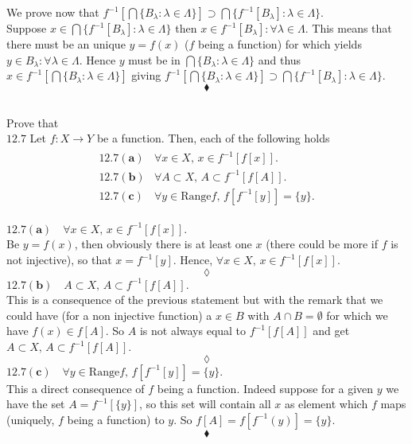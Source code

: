 We prove now that  $f^{-1}\left[\bigcap\{B_{\lambda}:\lambda \in \Lambda\}\right]\supset \bigcap\{f^{-1}[B_{\lambda}]:\lambda \in \Lambda\}$.\\
Suppose $x\in \bigcap\{f^{-1}[B_{\lambda}]:\lambda \in \Lambda\}$ then $x\in f^{-1}[B_{\lambda}]:\forall \lambda \in \Lambda$. This means that there must be an unique $y=f(x)$ ($f$ being a function) for which yields $y\in B_{\lambda}:\forall \lambda \in \Lambda$. Hence $y$ must be in $\bigcap\{B_{\lambda}:\lambda \in \Lambda\}$ and thus $x\in f^{-1}\left[\bigcap\{B_{\lambda}:\lambda \in \Lambda\}\right]$ giving $f^{-1}\left[\bigcap\{B_{\lambda}:\lambda \in \Lambda\}\right]\supset \bigcap\{f^{-1}[B_{\lambda}]:\lambda \in \Lambda\}$.
$$\blacklozenge$$

\subsection{}
\begin{tcolorbox}
Prove that \\
$\mathbf{12.7}$ Let $f:X\rightarrow Y$ be a function. Then, each of the following holds\\  
\begin{align*}
\begin{array}{ll}
\mathbf{12.7(a)}&\forall x\in X,\, x\in f^{-1}[f[x]]. \\
\mathbf{12.7(b)}&\forall A\subset X,\, A\subset f^{-1}[f[A]]. \\
\mathbf{12.7(c)}&\forall y\in \text{Range} f,\,  f[f^{-1}[y]]=\{y\}.
\end{array}
\end{align*}
\end{tcolorbox}
$\mathbf{12.7(a)}\quad \forall x\in X,\, x\in f^{-1}[f[x]]$. \\
Be $y=f(x)$, then obviously there is at least one $x$  (there could be more if $f$ is not injective), so that $x=  f^{-1}[y]$. Hence, $\forall x\in X,\, x\in f^{-1}[f[x]]$.
$$\lozenge$$
$\mathbf{12.7(b)}\quad A\subset X,\, A\subset f^{-1}[f[A]]$.\\
This is a consequence of the previous statement but with the remark that we could have (for a non injective function) a  $x\in B$ with $A\cap B=\emptyset$ for which we have $f(x) \in f[A]$. So $A$ is not always equal to $ f^{-1}[f[A]]$ and get $A\subset X,\, A\subset f^{-1}[f[A]]$.
$$\lozenge$$
$\mathbf{12.7(c)}\quad \forall y\in \text{Range} f,\,  f[f^{-1}[y]]=\{y\}$. \\
This a direct consequence of $f$ being a function. Indeed suppose for a given $y$ we have the set $A=f^{-1}[\{y\}]$, so this set will contain all $x$ as element which $f$ maps (uniquely, $f$ being a function) to $y$. So $f[A]= f[f^{-1}(y)]=\{y\}$.
$$\blacklozenge$$

